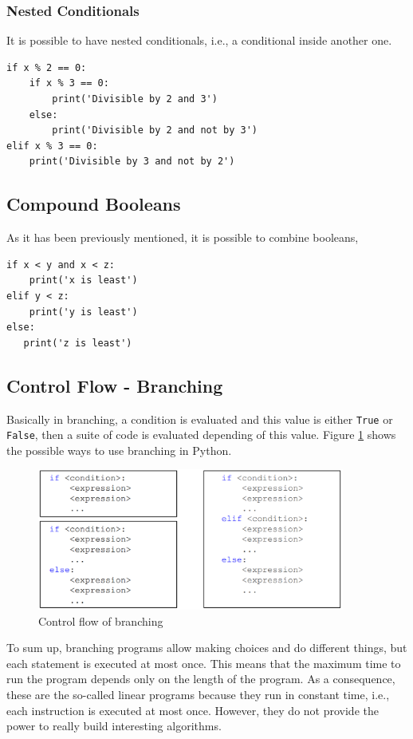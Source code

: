 \documentclass[a4paper]{article}
\newcommand{\inlinecode}{\texttt}
\begin{document}
\subsubsection{Nested Conditionals}

It is possible to have nested conditionals, i.e., a conditional inside another
one.

\begin{lstlisting}
if x % 2 == 0:
    if x % 3 == 0:
        print('Divisible by 2 and 3')
    else:
        print('Divisible by 2 and not by 3')
elif x % 3 == 0:
    print('Divisible by 3 and not by 2')
\end{lstlisting}

\subsection{Compound Booleans}

As it has been previously mentioned, it is possible to combine booleans,

\begin{lstlisting}
if x < y and x < z:
    print('x is least')
elif y < z:
    print('y is least')
else:
   print('z is least')
\end{lstlisting}

\subsection{Control Flow - Branching}

Basically in branching, a condition is evaluated and this value is either
\inlinecode{True} or \inlinecode{False}, then a suite of code is evaluated
depending of this value. Figure \ref{img:branching_flow} shows the possible
ways to use branching in Python.

\begin{figure}
  \centering
  \includegraphics[width=0.9\textwidth]{branching_flow.png}
  \caption{Control flow of branching}
  \label{img:branching_flow}
\end{figure}

To sum up, branching programs allow making choices and do different things, but
each statement is executed at most once. This means that the maximum time to
run the program depends only on the length of the program. As a consequence,
these are the so-called linear programs because they run in constant time,
i.e., each instruction is executed at most once. However, they do not provide
the power to really build interesting algorithms.
\end{document}
